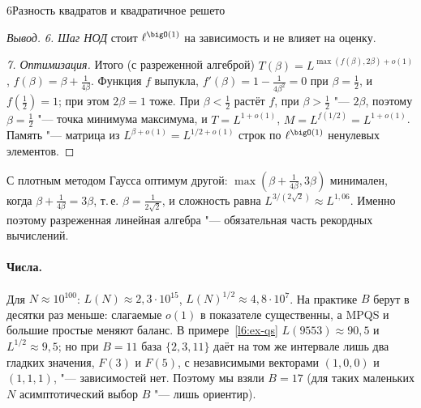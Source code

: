 \begin{lecture}{6}{Разность квадратов и квадратичное решето}
\begin{proof}[Вывод]
\emph{6. Шаг НОД} стоит $\ell^{\bigO(1)}$ на зависимость и не влияет на оценку.

\emph{7. Оптимизация.} Итого (с разреженной алгеброй) $T(\beta) = L^{\max(f(\beta), 2\beta) + o(1)}$,
$f(\beta) = \beta + \frac{1}{4\beta}$. Функция $f$ выпукла,
$f'(\beta) = 1 - \frac{1}{4\beta^2} = 0$ при $\beta = \frac12$, и $f(\frac12) = 1$; при этом
$2\beta = 1$ тоже. При $\beta < \frac12$ растёт $f$, при $\beta > \frac12$ "--- $2\beta$, поэтому
$\beta = \frac12$ "--- точка минимума максимума, и $T = L^{1 + o(1)}$, $M = L^{f(1/2)} = L^{1 + o(1)}$.
Память "--- матрица из $L^{\beta + o(1)} = L^{1/2 + o(1)}$ строк по $\ell^{\bigO(1)}$ ненулевых
элементов.
\end{proof}

\begin{remark}
С плотным методом Гаусса оптимум другой: $\max(\beta + \frac{1}{4\beta}, 3\beta)$ минимален, когда
$\beta + \frac{1}{4\beta} = 3\beta$, т.\,е. $\beta = \frac{1}{2\sqrt2}$, и сложность равна
$L^{3/(2\sqrt2)} \approx L^{1{,}06}$. Именно поэтому разреженная линейная алгебра "--- обязательная
часть рекордных вычислений.
\end{remark}

\paragraph{Числа.} Для $N \approx 10^{100}$: $L(N) \approx 2{,}3 \cdot 10^{15}$,
$L(N)^{1/2} \approx 4{,}8 \cdot 10^{7}$. На практике $B$ берут в десятки раз меньше: слагаемые
$o(1)$ в показателе существенны, а MPQS и большие простые меняют баланс. В
примере~\ref{l6:ex-qs} $L(9553) \approx 90{,}5$ и $L^{1/2} \approx 9{,}5$; но при $B = 11$ база
$\{2, 3, 11\}$ даёт на том же интервале лишь два гладких значения, $F(3)$ и $F(5)$, с
независимыми векторами $(1, 0, 0)$ и $(1, 1, 1)$, "--- зависимостей нет. Поэтому мы взяли $B = 17$
(для таких маленьких $N$ асимптотический выбор $B$ "--- лишь ориентир).


\end{lecture}
